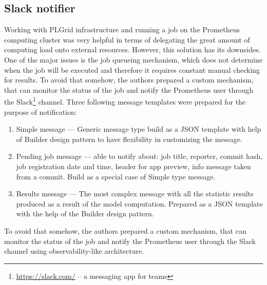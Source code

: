 \subsection{Slack notifier}\label{subsec:slack-notifier}
Working with PLGrid infrastructure and running a job on the Prometheus computing cluster was very helpful in terms of delegating the great amount of computing load onto external resources.
However, this solution has its downsides.
One of the major issues is the job queueing mechanism, which does not determine when the job will be executed and therefore it requires constant manual checking for results.
To avoid that somehow, the authors prepared a custom mechanism, that can monitor the status of the job and notify the Prometheus user through the Slack\footnote{\url{https://slack.com/} – a messaging app for teams} channel.
Three following message templates were prepared for the purpose of notification:
\begin{enumerate}
    \item Simple message --- Generic message type build as a JSON template with help of Builder design pattern to have flexibility in customizing the message.
    \item Pending job message --- able to notify about: job title, reporter, commit hash, job registration date and time, header for app preview, info message taken from a commit.
    Build as a special case of Simple type message.
    \item Results message --- The most complex message with all the statistic results produced as a result of the model computation.
    Prepared as a JSON template with the help of the Builder design pattern.
\end{enumerate}

To avoid that somehow, the authors prepared a custom mechanism, that can monitor the status of the job and notify the Prometheus user through the Slack channel using observability-like architecture.
